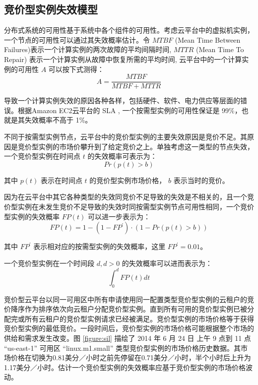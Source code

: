 \subsection{竞价型实例失效模型}
\label{jupiter-sifm}
分布式系统的可用性基于系统中各个组件的可用性。考虑云平台中的虚拟机实例，一个节点的可用性可以通过其失效概率估计。令 $MTBF$ (Mean Time Between Failures)表示一个计算实例的两次故障的平均间隔时间, $MTTR$ (Mean Time To Repair) 表示一个计算实例从故障中恢复所需的平均时间, 云平台中的一个计算实例的可用性 $A$ 可以按下式测得：
\begin{equation}\label{eq_a}
A = \frac{MTBF}{MTBF+MTTR}
\end{equation}

导致一个计算实例失效的原因各种各样，包括硬件、软件、电力供应等层面的错误。根据Amazon EC2云平台的 SLA \cite{AWS_SLA:2014}, 一个按需型实例的可用性保证是 99\%，也就是其失效概率不高于 1\%。

不同于按需型实例节点，云平台中的竞价型实例的主要失效原因是竞价不足。其原因是竞价型实例的市场价攀升到了给定竞价之上。单独考虑这一类型的节点失效，一个竞价型实例在时间点 $t$ 的失效概率可表示为：
\begin{equation}\label{eq_a_ob_instant}
Pr(p(t)>b)
\end{equation}

其中 $p(t)$ 表示在时间点 $t$ 的竞价型实例市场价格， $b$ 表示当时的竞价。


因为在云平台中其它各种类型的失效同竞价不足导致的失效是不相关的，且一个竞价型实例在未发生竞价不足导致的失效时同按需型实例节点可用性相同，一个竞价型实例的失效概率 $FP(t)$ 可以进一步表示为：
\begin{equation}\label{eq_a_instant}
FP(t) = 1 - (1 - FP^{\prime}) \cdot (1 - Pr(p(t)>b))
\end{equation}

其中 $FP^{\prime}$ 表示相对应的按需型实例的失效概率，这里 $FP^{\prime} = 0.01$。

一个竞价型实例在一个时间段 $d, d>0$ 的失效概率可以进而表示为：
\begin{equation}\label{eq_fpd}
\int_0^d FP(t)dt
\end{equation}

竞价型云平台以同一可用区中所有申请使用同一配置类型竞价型实例的云租户的竞价降序作为排序依次向云租户分配竞价型实例。直到所有可用的竞价型实例已被分配完或所有云租户的竞价型实例请求已经被满足。竞价型实例的市场价格等于获得竞价型实例的最低竞价。一段时间后，竞价型实例的市场价格可能根据整个市场的供给和需求发生改变。图 \ref{figure:sil} 描绘了 2014 年 6 月 24 日 上午 9 点到 11 点 ``us-east-1'' 可用区 ``linux.m1.small'' 类型竞价型实例的市场价格历史数据。其市场价格在切换为0.81美分／小时之前先停留在0.71美分／小时，半个小时后上升为1.17美分／小时。估计一个竞价型实例的失效概率应基于竞价型实例的市场价格波动。

